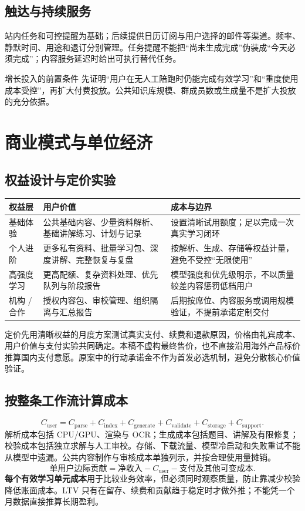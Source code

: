 \documentclass[UTF8,a4paper,11pt,fontset=none]{ctexart}
\newcommand{\cth}[1]{\textbf{\sffamily #1}}
\newcommand{\newsec}[1]{\clearpage\section{#1}}
\newenvironment{tbl}{\par\vspace{3pt}\small\noindent\ignorespaces}{\unskip\par\vspace{5pt}}
\begin{document}
\subsection{触达与持续服务}
站内任务和可控提醒为基础；后续提供日历订阅与用户选择的邮件等渠道。频率、静默时间、用途和退订分别管理。任务提醒不能把“尚未生成完成”伪装成“今天必须完成”；内容服务延迟时给出可执行替代任务。

\begin{insight}{增长投入的前置条件}
先证明“用户在无人工陪跑时仍能完成有效学习”和“重度使用成本受控”，再扩大付费投放。公共知识库规模、群成员数或生成量不是扩大投放的充分依据。
\end{insight}

\newsec{商业模式与单位经济}
\subsection{权益设计与定价实验}
\begin{tbl}
\begin{tabularx}{\linewidth}{@{}L{25mm}YY@{}}
\toprule
\cth{权益层}&\cth{用户价值}&\cth{成本与边界}\\\midrule
基础体验&公共基础内容、少量资料解析、基础讲解练习、计划与记录&设置清晰试用额度；足以完成一次真实学习闭环\\
个人进阶&更多私有资料、批量学习包、深度讲解、完整恢复与复盘&按解析、生成、存储等权益计量，避免不受控“无限使用”\\
高强度学习&更高配额、复杂资料处理、优先队列与阶段报告&模型强度和优先级明示，不以质量较差内容惩罚低档用户\\
机构 / 合作&授权内容包、审校管理、组织隔离与汇总报告&后期按席位、内容服务或调用规模验证，不提前承诺定制交付\\
\bottomrule
\end{tabularx}
\end{tbl}

定价先用清晰权益的月度方案测试真实支付、续费和退款原因，价格由礼宾成本、用户价值与支付实验共同确定。本稿不虚构最终售价，也不直接沿用海外产品标价推算国内支付意愿。原案中的行动承诺金不作为首发必选机制，避免分散核心价值验证。

\subsection{按整条工作流计算成本}
\[
C_{\mathrm{user}}=C_{\mathrm{parse}}+C_{\mathrm{index}}+C_{\mathrm{generate}}+
C_{\mathrm{validate}}+C_{\mathrm{storage}}+C_{\mathrm{support}}.
\]
解析成本包括 CPU/GPU、渲染与 OCR；生成成本包括题目、讲解及有限修复；校验成本包括独立求解与人工审校。存储、下载流量、模型冷启动和失败重试不能从模型中遗漏。公共内容制作与审核成本单独列示，并按合理使用量摊销。
\[
\text{单用户边际贡献}=\text{净收入}-C_{\mathrm{user}}-\text{支付及其他可变成本}.
\]
\textbf{每个有效学习单元成本}用于比较业务效率，但必须同时观察质量，防止靠减少校验降低账面成本。LTV 只有在留存、续费和贡献趋于稳定时才做外推；不能凭一个月数据直接推算长期盈利。
\end{document}
